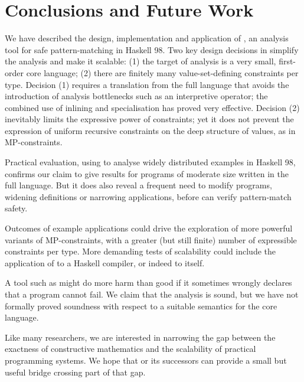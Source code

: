 \section{Conclusions and Future Work}
\label{sec:conclusion}

We have described the design, implementation and application of \catch{},
an analysis tool for safe pattern-matching in Haskell 98.  Two key
design decisions in \catch{} simplify the analysis and make it scalable:
(1) the target of analysis is a very small, first-order core language;
(2) there are finitely many value-set-defining constraints per type.
Decision (1) requires a translation from the full language that avoids
the introduction of analysis bottlenecks such as an interpretive 
operator; the combined use of inlining and specialisation has proved
very effective.  Decision (2) inevitably limits the expressive power of
constraints; yet it does not prevent the expression of uniform recursive
constraints on the deep structure of values, as in MP-constraints.

Practical evaluation, using \catch{} to analyse widely distributed examples
in Haskell 98, confirms our claim to give results for programs of moderate
size written in the full language. But it does also reveal a frequent need
to modify programs, widening definitions or narrowing applications,
before \catch{} can verify pattern-match safety.

Outcomes of example applications could drive the exploration of more
powerful variants of MP-constraints, with a greater (but still finite)
number of expressible constraints per type.  More demanding tests of
scalability could include the application of \catch{} to a Haskell compiler,
or indeed to \catch{} itself.

A tool such as \catch{} might do more harm than good if it sometimes wrongly
declares that a program cannot fail.  We claim that the \catch{} analysis
is sound, but we have not formally proved soundness with respect to a
suitable semantics for the core language.

Like many researchers, we are interested in narrowing the gap between the
exactness of constructive mathematics and the scalability of practical
programming systems.  We hope that \catch{} or its successors can provide
a small but useful bridge crossing part of that gap.
